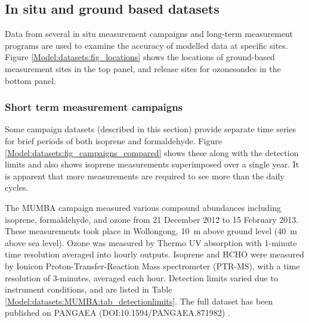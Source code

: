   \subsection{In situ and ground based datasets}
  
    Data from several in situ measurement campaigns and long-term measurement programs are used to examine the accuracy of modelled data at specific sites.
    Figure \ref{Model:datasets:fig_locations} shows the locations of ground-based measurement sites in the top panel, and release sites for ozonesondes in the bottom panel.
    
    
    \subsubsection{Short term measurement campaigns}
      Some campaign datasets (described in this section) provide separate time series for brief periods of both isoprene and formaldehyde.
      Figure \ref{Model:datasets:fig_campaigns_compared} shows these along with the detection limits and also shows isoprene measurements superimposed over a single year.
      It is apparent that more measurements are required to see more than the daily cycles.
      
    
    \label{Model:datasets:MUMBA}
    
      The MUMBA campaign \parencite{PatonWalsh2017} measured various compound abundances including isoprene, formaldehyde, and ozone from 21 December 2012 to 15 February 2013.
      These measurements took place in Wollongong, 10~m above ground level (40~m above sea level).
      Ozone was measured by Thermo UV absorption with 1-minute time resolution averaged into hourly outputs.
      Isoprene and HCHO were measured by Ionicon Proton-Transfer-Reaction Mass spectrometer (PTR-MS), with a time resolution of 3-minutes, averaged each hour.
      Detection limits varied due to instrument conditions, and are listed in Table \ref{Model:datasets:MUMBA:tab_detectionlimits}.
      The full dataset has been published on PANGAEA (DOI:10.1594/PANGAEA.871982) \parencite{Guerette2018}.
      
